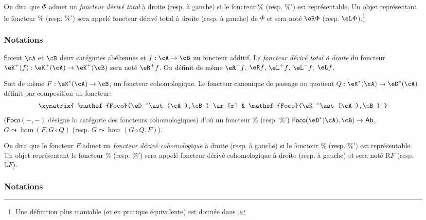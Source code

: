 \begin{definition}\label{VIII:4-1-2}
On dira que $\Phi$ admet un \emph{foncteur dérivé total} à droite (resp. 
à gauche) si le foncteur $\%$ (resp. $\%'$) est représentable. Un objet 
représentant le foncteur $\%$ (resp. $\%'$) sera appelé foncteur dérivé 
total à droite (resp. à gauche) de $\Phi$ et sera noté 
$\eR \Phi$ (resp. $\eL \Phi$).\footnote{Une définition plus maniable (et en 
pratique équivalente) est donnée dans \cite[XVII 1.2]{sga4}.}
\end{definition}





\subsubsection{Notations}\label{VIII:4-1-3}

Soient $\cA$ et $\cB$ deux catégories abéliennes et $f:\cA\to \cB$ un 
foncteur additif. Le \emph{foncteur dérivé total à droite} du foncteur 
$\eK^+(f):\eK^+(\cA) \to \eK^+(\cB)$ sera noté $\eR^+ f$. On définit de 
même $\eR^- f$, $\eR f$, $\eL^+ f$, $\eL^- f$, $\eL f$. 

Soit de même $F:\eK^\ast(\cA) \to \cB$, un foncteur cohomologique. Le 
foncteur canonique de passage au quotient $Q:\eK^\ast(\cA) \to \eD^\ast(\cA)$ 
définit par composition un foncteur: 
\[\xymatrix{
  \mathsf{Foco}(\eD^\ast(\cA),\cB) \ar[r] 
    & \mathsf{Foco}(\eK^\ast(\cA),\cB) 
}\]
($\mathsf{Foco}(-,-)$ désigne la catégorie des foncteurs cohomologiques) 
d'où un foncteur $\%$ (resp. $\%'$) 
$\mathsf{Foco}(\eD^\ast(\cA),\cB) \to \mathsf{Ab}$, $G\leadsto \hom(F,G\circ Q)$ 
(resp. $G\leadsto \hom(G\circ Q,F)$). 





\begin{definition}\label{VIII:4-1-4}
On dira que le foncteur $F$ admet un \emph{foncteur dérivé cohomologique} 
à droite (resp. à gauche) si le foncteur $\%$ (resp. $\%'$) est 
représentable. Un objet représentant le foncteur $\%$ (resp. $\%'$) sera 
appelé foncteur dérivé cohomologique à droite (resp. à gauche) et 
sera noté $\mathrm{R} F$ (resp. $\mathrm{L} F$). 
\end{definition}





\subsubsection{Notations}\label{VIII:4-1-5}

